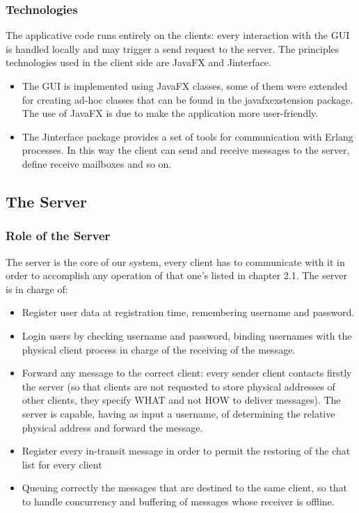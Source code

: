 \subsubsection{Technologies}
The applicative code runs entirely on the clients: every interaction with the GUI is handled locally and may trigger a send request to the server. The principles technologies used in the client side are JavaFX and Jinterface.
\begin{itemize}
	\item The GUI is implemented using JavaFX classes, some of them were extended for creating ad-hoc classes that can be found in the javafxexstension package. The use of JavaFX is due to make the application more user-friendly.
	\item The Jinterface package provides a set of tools for communication with Erlang processes. In this way the client can send and receive messages to the server, define receive mailboxes and so on.
\end{itemize}

\subsection{The Server}
\subsubsection{Role of the Server}
The server is the core of our system, every client has to communicate with it in order to accomplish any operation of that one’s listed in chapter 2.1.
The server is in charge of:

\begin{itemize}
	\item Register user data at registration time, remembering username and password.
	\item Login users by checking username and password, binding usernames with the physical client process in charge of the receiving of the message.
	\item Forward any message to the correct client: every sender client contacts firstly the server (so that clients are not requested to store physical addresses of other clients, they specify WHAT and not HOW to deliver messages). The server is capable, having as input a username, of determining the relative physical address and forward the message.
	\item Register every in-transit message in order to permit the restoring of the chat list for every client
	\item Queuing correctly the messages that are destined to the same client, so that to handle concurrency and buffering of messages whose receiver is offline. 
\end{itemize}

